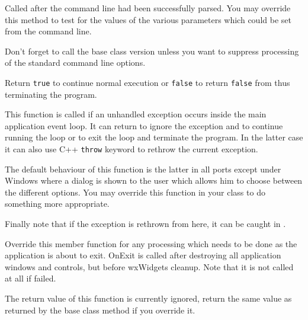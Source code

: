 
Called after the command line had been successfully parsed. You may override
this method to test for the values of the various parameters which could be
set from the command line.

Don't forget to call the base class version unless you want to suppress
processing of the standard command line options.

Return {\tt true} to continue normal execution or {\tt false} to return 
{\tt false} from  thus terminating the program.




\label{wxapponexceptioninmainloop}


This function is called if an unhandled exception occurs inside the main
application event loop. It can return \true to ignore the exception and to
continue running the loop or \false to exit the loop and terminate the
program. In the latter case it can also use C++ \texttt{throw} keyword to
rethrow the current exception.

The default behaviour of this function is the latter in all ports except under
Windows where a dialog is shown to the user which allows him to choose between
the different options. You may override this function in your class to do
something more appropriate.

Finally note that if the exception is rethrown from here, it can be caught in 
.


\label{wxapponexit}


Override this member function for any processing which needs to be
done as the application is about to exit. OnExit is called after
destroying all application windows and controls, but before
wxWidgets cleanup. Note that it is not called at all if 
 failed.

The return value of this function is currently ignored, return the same value
as returned by the base class method if you override it.


\label{wxapponfatalexception}

